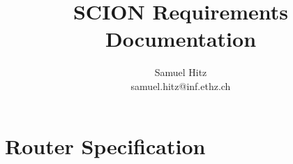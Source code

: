 \documentclass[11pt, a4paper]{article}
\begin{document}
\title{SCION Requirements Documentation}
\author{Samuel Hitz \\ samuel.hitz@inf.ethz.ch}
\maketitle


\newpage
\label{sec:router}
\section{Router Specification}

\end{document}
